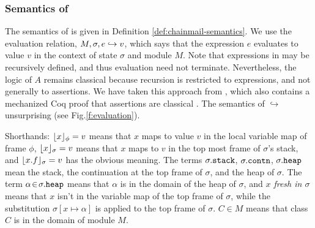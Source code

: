 \subsubsection{Semantics of \SpecO}
The semantics of \SpecO   
is given in Definition \ref{def:chainmail-semantics}. 
We   use the evaluation relation, $M, \sigma, e \hookrightarrow v$,
which says that the expression $e$ evaluates
to value $v$ in the context of state $\sigma$ and module $M$.
Note that expressions in \Loo may be recursively defined, and thus evaluation 
need not  %
 terminate. Nevertheless, the logic of $A$ remains classical because recursion is restricted
to expressions, and not generally to assertions.
We have taken this approach from , which also contains a mechanized Coq proof that assertions are classical \cite{coqFASE}.
The semantics of $\hookrightarrow$  unsurprising (see Fig.\ref{f:evaluation}).

Shorthands: 
 $\lfloor x \rfloor_{\phi} = v$  means that $x$ maps to
value $v$ in the local variable map of frame $\phi$, $\lfloor x \rfloor_{\sigma} = v$ means that $x$ 
maps to $v$ in the top most frame of $\sigma$'s stack, and $\lfloor x.f \rfloor_{\sigma} = v$
has the obvious meaning. The terms $\sigma.{\texttt{stack}}$,  
$\sigma.{\texttt{contn}}$, 
$\sigma.{\texttt{heap}}$     mean the stack, 
the continuation at the
top frame of $\sigma$, %
and the heap of $\sigma$.
The term $\alpha\!\in\!\sigma.{\texttt{heap}}$ means that $\alpha$ is in the domain of the heap of $\sigma$, and \emph{$x$ fresh in $\sigma$} means that 
$x$ isn't in the variable map of the top frame of $\sigma$, 
while the substitution  $\sigma[x \mapsto \alpha]$ is applied to the top frame of $\sigma$.
$C\in M$ means that class $C$ is in the domain of module $M$. 

